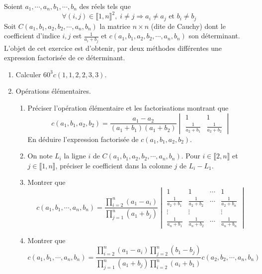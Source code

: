 Soient $a_1, \cdots, a_n, b_1, \cdots, b_n$ des réels tels que
\begin{displaymath}
\forall (i,j)\in \llbracket 1,n \rrbracket^2,\; i\neq j \Rightarrow a_i \neq a_j \text{ et } b_i \neq b_j  
\end{displaymath}
Soit $C(a_1,b_1,a_2,b_2,\cdots,a_n,b_n)$ la matrice $n\times n$ (dite de Cauchy) dont le coefficient d'indice $i,j$ est $\frac{1}{a_i + b_j}$ et $c(a_1,b_1,a_2,b_2,\cdots,a_n,b_n)$ son déterminant.\newline
L'objet de cet exercice est d'obtenir, par deux méthodes différentes une expression factorisée de ce déterminant.
\begin{enumerate}
  \item Calculer $60^3 c(1,1,2,2,3,3)$.

  \item Opérations élémentaires.
\begin{enumerate}
  \item Préciser l'opération élémentaire et les factorisations montrant que
\begin{displaymath}
c(a_1,b_1,a_2,b_2)=
\frac{a_1-a_2}{(a_1+b_1)(a_1+b_2)}
\begin{vmatrix}
  1 & 1 \\ \frac{1}{a_2 + b_1} & \frac{1}{a_2 + b_2}
\end{vmatrix}
\end{displaymath}
En déduire l'expression factorisée de $c(a_1,b_1,a_2,b_2)$.
  \item On note $L_i$ la ligne $i$ de $C(a_1,b_1,a_2,b_2,\cdots,a_n,b_n)$. Pour $i\in \llbracket 2,n\rrbracket$ et $j\in \llbracket 1,n \rrbracket$, préciser le coefficient dans la colonne $j$ de $L_i - L_1$.
  \item Montrer que
\begin{displaymath}
c(a_1,b_1,\cdots,a_n,b_n) = \frac{\prod_{i=2}^n(a_1 - a_i)}{\prod_{j=1}^n(a_1 + b_j)}
\begin{vmatrix}
  1                 & 1                  & \cdots & 1 \\
 \frac{1}{a_2 + b_1}& \frac{1}{a_2 + b_2}& \cdots &\frac{1}{a_2 + b_n} \\
 \vdots             &   \vdots           &        & \vdots             \\
 \frac{1}{a_n + b_1}& \frac{1}{a_n + b_2}& \cdots &\frac{1}{a_n + b_n} 
 \end{vmatrix}
\end{displaymath}
  \item Montrer que
\begin{displaymath}
c(a_1,b_1,\cdots,a_n,b_n) = 
\frac{\prod_{i=2}^n(a_1 - a_i)\prod_{j=2}^n(b_1-b_j)}{\prod_{j=1}^n(a_1 + b_j)\prod_{i=2}^n(a_i + b_1)}  
c(a_2,b_2,\cdots,a_n,b_n)
\end{displaymath}
\end{enumerate}


\end{enumerate}
